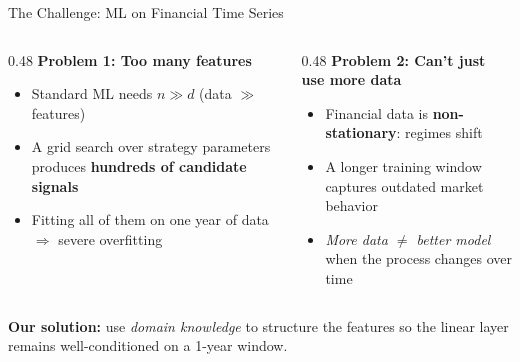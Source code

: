 \documentclass[aspectratio=169]{beamer}
\begin{document}
\begin{frame}{The Challenge: ML on Financial Time Series}

  \begin{columns}[T]
    \begin{column}{0.48\textwidth}
      \textbf{Problem 1: Too many features}
      \begin{itemize}
        \item Standard ML needs $n \gg d$ (data $\gg$ features)
        \item A grid search over strategy parameters produces \textbf{hundreds of candidate signals}
        \item Fitting all of them on one year of data $\Rightarrow$ severe overfitting
      \end{itemize}
    \end{column}
    \begin{column}{0.48\textwidth}
      \textbf{Problem 2: Can't just use more data}
      \begin{itemize}
        \item Financial data is \textbf{non-stationary}: regimes shift
        \item A longer training window captures outdated market behavior
        \item \emph{More data $\neq$ better model} when the process changes over time
      \end{itemize}
    \end{column}
  \end{columns}

  \vspace{0.8em}
  \begin{center}
  \end{center}

  \vspace{0.4em}
  \begin{center}
    \textbf{Our solution:} use \emph{domain knowledge} to structure the features
    so the linear layer remains well-conditioned on a 1-year window.
  \end{center}

\end{frame}
\end{document}

